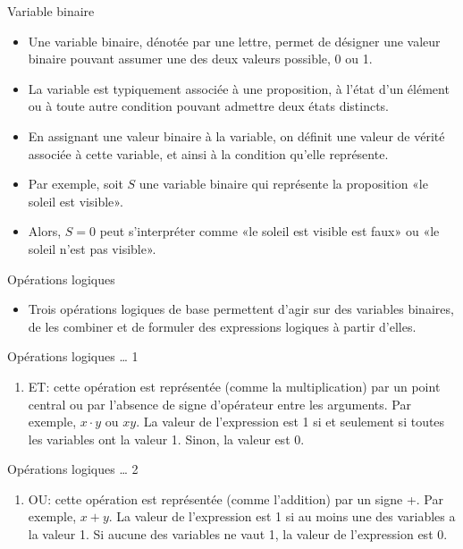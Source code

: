 \documentclass[presentation]{beamer}
\begin{document}
\begin{frame}[label={sec:orge70a30a}]{Variable binaire}
\begin{itemize}
\item Une variable binaire, dénotée par une lettre, permet de désigner une valeur binaire pouvant assumer une des deux valeurs possible, 0 ou 1.

\item La variable est typiquement associée à une proposition, à l'état d'un élément ou à toute autre condition pouvant admettre deux états distincts.

\item En assignant une valeur binaire à la variable, on définit une valeur de vérité associée à cette variable, et ainsi à la condition qu'elle représente.

\item Par exemple, soit \(S\) une variable binaire qui représente la proposition «le soleil est visible».

\item Alors, \(S=0\) peut s'interpréter comme «le soleil est visible est faux» ou «le soleil n'est pas visible».
\end{itemize}
\end{frame}

\begin{frame}[label={sec:org2e5c247}]{Opérations logiques}
\begin{itemize}
\item Trois opérations logiques de base permettent d'agir sur des variables binaires, de les combiner et de formuler des expressions logiques à partir d'elles.
\end{itemize}
\end{frame}


\begin{frame}[label={sec:org19426e6}]{Opérations logiques \ldots{} 1}
\begin{enumerate}
\item ET: cette opération est représentée (comme la multiplication) par
un point central ou par l'absence de signe d'opérateur entre les
arguments.  Par exemple, \(x \cdot y\) ou \(x y\).  La valeur de
l'expression est 1 si et seulement si toutes les variables ont la
valeur 1. Sinon, la valeur est 0.
\end{enumerate}
\end{frame}

\begin{frame}[label={sec:org9798199}]{Opérations logiques \ldots{} 2}
\begin{enumerate}
\item OU: cette opération est représentée (comme l'addition) par un signe
+. Par exemple, \(x + y\). La valeur de l'expression est 1 si au
moins une des variables a la valeur 1. Si aucune des variables ne
vaut 1, la valeur de l'expression est 0.
\end{enumerate}
\end{frame}
\end{document}
